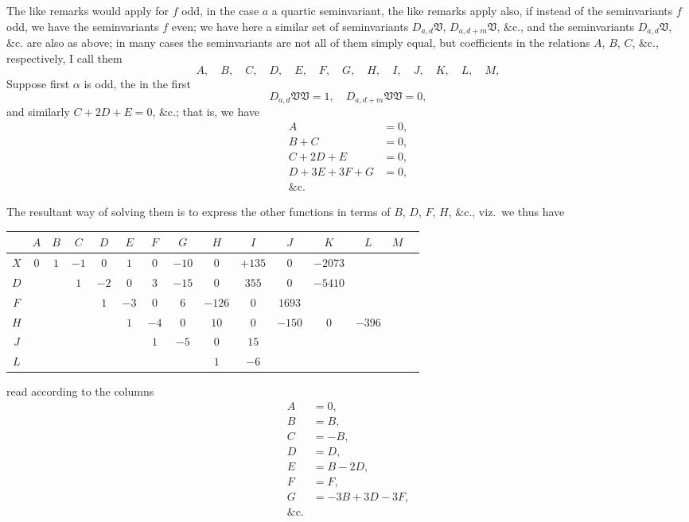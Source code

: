 \documentclass[12pt,a4paper]{article}
\theoremstyle{definition}
\begin{document}
The like remarks would apply for $f$ odd, in the case $a$ a quartic seminvariant, the like remarks apply also, if instead of the seminvariants $f$ odd, we have the seminvariants $f$ even; we have here a similar set of seminvariants $D_{a,d}\mathfrak{V}$, $D_{a,d+m}\mathfrak{V}$, $\&\text{c.}$, and the seminvariants $D_{a,d}\mathfrak{V}$, $\&\text{c.}$ are also as above; in many cases the seminvariants are not all of them simply equal, but coefficients in the relations $A$, $B$, $C$, $\&\text{c.}$, respectively, I call them
\[
A, \quad B, \quad C, \quad D, \quad E, \quad F, \quad G, \quad H, \quad I, \quad J, \quad K, \quad L, \quad M,
\]
Suppose first $\alpha$ is odd, the in the first
\[
D_{a,d}\mathfrak{V}\mathfrak{V} = 1, \quad D_{a,d+m}\mathfrak{V}\mathfrak{V} = 0,
\]
and similarly $C + 2D + E = 0$, $\&\text{c.}$; that is, we have
\begin{align*}
A &= 0, \\
B + C &= 0, \\
C + 2D + E &= 0, \\
D + 3E + 3F + G &= 0, \\
\&\text{c.}
\end{align*}

The resultant way of solving them is to express the other functions in terms of $B$, $D$, $F$, $H$, $\&\text{c.}$, viz.\ we thus have

\medskip
\begin{center}
\begin{tabular}{c|cccccccccccccc}
& $A$ & $B$ & $C$ & $D$ & $E$ & $F$ & $G$ & $H$ & $I$ & $J$ & $K$ & $L$ & $M$ & \\
\hline
$X$ & $0$ & $1$ & $-1$ & $0$ & $1$ & $0$ & $-10$ & $0$ & $+135$ & $0$ & $-2073$ & & & \\
$D$ & & & $1$ & $-2$ & $0$ & $3$ & $-15$ & $0$ & $355$ & $0$ & $-5410$ & & & \\
$F$ & & & & $1$ & $-3$ & $0$ & $6$ & $-126$ & $0$ & $1693$ & & & & \\
$H$ & & & & & $1$ & $-4$ & $0$ & $10$ & $0$ & $-150$ & $0$ & $-396$ & & \\
$J$ & & & & & & $1$ & $-5$ & $0$ & $15$ & & & & & \\
$L$ & & & & & & & & $1$ & $-6$ & & & & &
\end{tabular}
\end{center}
\medskip

read according to the columns
\begin{align*}
A &= 0, \\
B &= B, \\
C &= -B, \\
D &= D, \\
E &= B - 2D, \\
F &= F, \\
G &= -3B + 3D - 3F, \\
\&\text{c.}
\end{align*}
\end{document}
